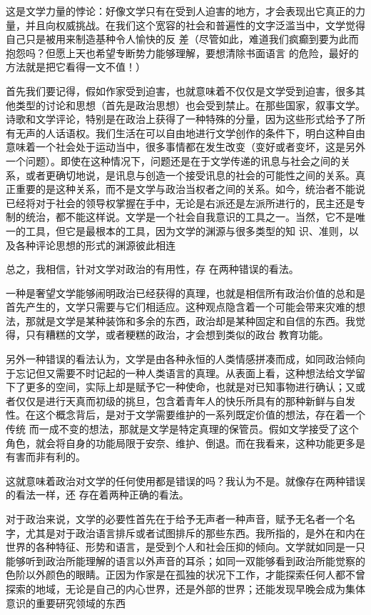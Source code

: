 \documentclass{article}
\begin{document}
这是文学力量的悖论：好像文学只有在受到人迫害的地方，才会表现出它真正的力量，并且向权威挑战。在我们这个宽容的社会和普遍性的文字泛滥当中，文学觉得自己只是被用来制造基种令人愉快的反
\newpage
差（尽管如此，难道我们疯癫到要为此而抱怨吗？但愿上天也希望专断势力能够理解，要想清除书面语言
的危险，最好的方法就是把它看得一文不值！） 

首先我们要记得，假如作家受到迫害，也就意味着不仅仅是文学受到迫害，很多其他类型的讨论和思想（首先是政治思想）也会受到禁止。在那些国家，叙事文学。诗歌和文学评论，特别是在政治上获得了一种特殊的分量，因为这些形式给予了所有无声的人话语权。我们生活在可以自由地进行文学创作的条件下，明白这种自由意味着一个社会处于运动当中，很多事情都在发生改变（变好或者变坏，这是另外一个问题）。即使在这种情况下，问题还是在于文学传递的讯息与社会之间的关系，或者更确切地说，是讯息与创造一个接受讯息的社会的可能性之间的关系。真正重要的是这种关系，而不是文学与政治当权者之间的关系。如今，统治者不能说已经将对于社会的领导权掌握在手中，无论是右派还是左派所进行的，民主还是专制的统治，都不能这样说。文学是一个社会自我意识的工具之一。当然，它不是唯一的工具，但它是最根本的工具，因为文学的渊源与很多类型的知
\newpage
识、准则，以及各种评论思想的形式的渊源彼此相连

总之，我相信，针对文学对政治的有用性，存
在两种错误的看法。 

一种是奢望文学能够闹明政治已经获得的真理，也就是相信所有政治价值的总和是首先产生的，文学只需要与它们相适应。这种观点隐含着一个可能会带来灾难的想法，那就是文学是某种装饰和多余的东西，政治却是某种固定和自信的东西。我觉得，只有糟糕的文学，或者粳糕的政治，才会想到类似的政台
教育功能。 

另外一种错误的看法认为，文学是由各种永恒的人类情感拼凑而成，如同政治倾向于忘记但又需要不时记起的一种人类语言的真理。从表面上看，这种想法给文学留下了更多的空间，实际上却是赋予它一种使命，也就是对已知事物进行确认；又或者仅仅是进行天真而初级的挑旦，包含着青年人的快乐所具有的那种新鲜与自发性。在这个概念背后，是对于文学需要维护的一系列既定价值的想法，存在着一个传统
\newpage
而一成不变的想法，那就是文学是特定真理的保管员。假如文学接受了这个角色，就会将自身的功能局限于安奈、维护、倒退。而在我看来，这种功能更多是
有害而非有利的。 

这就意味着政治对文学的任何使用都是错误的吗？我认为不是。就像存在两种错误的看法一样，还
存在着两种正确的看法。 

对于政治来说，文学的必要性首先在于给予无声者一种声音，赋予无名者一个名字，尤其是对于政治语言排斥或者试图排斥的那些东西。我所指的，是外在和内在世界的各种特征、形势和语言，是受到个人和社会压抑的倾向。文学就如同是一只能够听到政治所能理解的语言以外声音的耳杀；如同一双能够看到政治所能觉察的色阶以外颜色的眼睛。正因为作家是在孤独的状况下工作，才能探索任何人都不曾探索的地域，无论是自己的内心世界，还是外部的世界；还能发现早晚会成为集体意识的重要研究领域的东西
\end{document}
